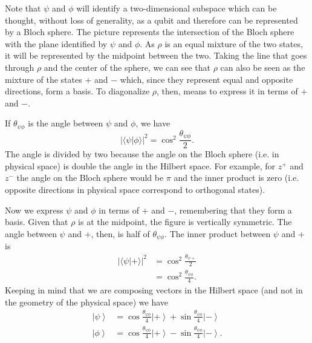 \documentclass[10pt,twocolumn, nofootinbib]{revtex4-2}
\begin{document}
Note that $\psi$ and $\phi$ will identify a two-dimensional subspace which can be thought, without loss of generality, as a qubit and therefore can be represented by a Bloch sphere. The picture represents the intersection of the Bloch sphere with the plane identified by $\psi$ and $\phi$. As $\rho$ is an equal mixture of the two states, it will be represented by the midpoint between the two. Taking the line that goes through $\rho$ and the center of the sphere, we can see that $\rho$ can also be seen as the mixture of the states $+$ and $-$ which, since they represent equal and opposite directions, form a basis. To diagonalize $\rho$, then, means to express it in terms of $+$ and $-$.

If $\theta_{\psi\phi}$ is the angle between $\psi$ and $\phi$, we have
\begin{equation}
	|\langle \psi | \phi \rangle |^2 = \cos^2 \frac{\theta_{\psi\phi}}{2}.
\end{equation}
The angle is divided by two because the angle on the Bloch sphere (i.e. in physical space) is double the angle in the Hilbert space. For example, for $z^+$ and $z^-$ the angle on the Bloch sphere would be $\pi$ and the inner product is zero (i.e. opposite directions in physical space correspond to orthogonal states).

Now we express $\psi$ and $\phi$ in terms of $+$ and $-$, remembering that they form a basis. Given that $\rho$ is at the midpoint, the figure is vertically symmetric. The angle between $\psi$ and $+$, then, is half of $\theta_{\psi\phi}$. The inner product between $\psi$ and $+$ is
\begin{equation}
	\begin{aligned}
		|\langle \psi | + \rangle |^2 &= \cos^2 \frac{\theta_{\psi +}}{2} \\
		&= \cos^2 \frac{\theta_{\psi\phi}}{4}.
	\end{aligned}
\end{equation}
Keeping in mind that we are composing vectors in the Hilbert space (and not in the geometry of the physical space) we have
\begin{align*}
	\left|\psi\right>&=\cos\frac{\theta_{\psi\phi}}{4}\left|+\right>+\sin\frac{\theta_{\psi\phi}}{4}\left|-\right> \\
	\left|\phi\right>&=\cos\frac{\theta_{\psi\phi}}{4}\left|+\right>-\sin\frac{\theta_{\psi\phi}}{4}\left|-\right>.
\end{align*}
\end{document}
